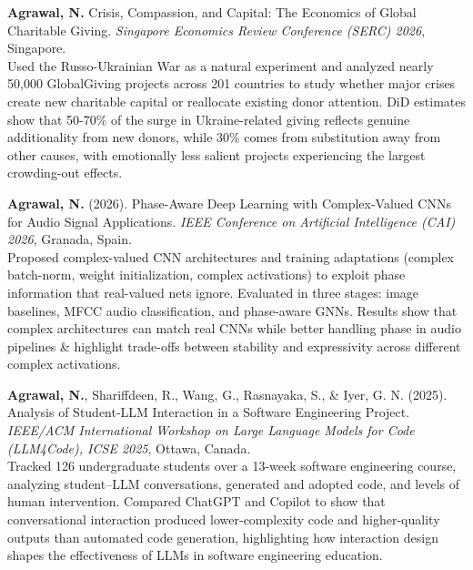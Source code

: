 \documentclass[10pt,a4paper]{article}
\begin{document}
\vspace{5pt}

\textbf{Agrawal, N.} Crisis, Compassion, and Capital: The Economics of Global Charitable Giving. \textit{Singapore Economics Review Conference (SERC) 2026}, Singapore.\\
{\small Used the Russo-Ukrainian War as a natural experiment and analyzed nearly 50,000 GlobalGiving projects across 201 countries to study whether major crises create new charitable capital or reallocate existing donor attention. DiD estimates show that 50-70\% of the surge in Ukraine-related giving reflects genuine additionality from new donors, while 30\% comes from substitution away from other causes, with emotionally less salient projects experiencing the largest crowding-out effects.}

\vspace{5pt}

\textbf{Agrawal, N.} (2026). Phase-Aware Deep Learning with Complex-Valued CNNs for Audio Signal Applications. \textit{IEEE Conference on Artificial Intelligence (CAI) 2026}, Granada, Spain.\\
{\small Proposed complex-valued CNN architectures and training adaptations (complex batch-norm, weight initialization, complex activations) to exploit phase information that real-valued nets ignore. Evaluated in three stages: image baselines, MFCC audio classification, and phase-aware GNNs. Results show that complex architectures can match real CNNs while better handling phase in audio pipelines \& highlight trade-offs between stability and expressivity across different complex activations.}

\vspace{5pt}

\textbf{Agrawal, N.}, Shariffdeen, R., Wang, G., Rasnayaka, S., \& Iyer, G. N. (2025). Analysis of Student-LLM Interaction in a Software Engineering Project. \textit{IEEE/ACM International Workshop on Large Language Models for Code (LLM4Code), ICSE 2025}, Ottawa, Canada.\\
{\small Tracked 126 undergraduate students over a 13-week software engineering course, analyzing student--LLM conversations, generated and adopted code, and levels of human intervention. Compared ChatGPT and Copilot to show that conversational interaction produced lower-complexity code and higher-quality outputs than automated code generation, highlighting how interaction design shapes the effectiveness of LLMs in software engineering education.}
\end{document}

